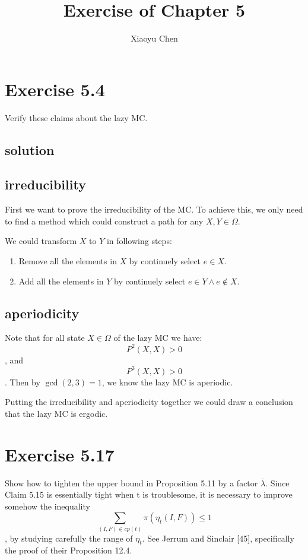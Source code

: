 \documentclass{article}
\title{Exercise of Chapter 5}
\author{Xiaoyu Chen}
\date{}
\begin{document}
\maketitle

\section{Exercise 5.4}
Verify these claims about the lazy MC.
\subsection{solution}
\subsection{irreducibility}
First we want to prove the irreducibility of the MC. To achieve this, we only need to find a method which could construct a path for any $X, Y\in\Omega$.
\begin{tcolorbox}[title = {Suppose we have $X, Y\in\Omega$}]
  We could transform $X$ to $Y$ in following steps:
  \begin{enumerate}[itemsep=0mm]
  \item Remove all the elements in $X$ by continuely select $e\in X$.
  \item Add all the elements in $Y$ by continuely select $e\in Y \land e\not\in X$.
  \end{enumerate}
\end{tcolorbox}
\subsection{aperiodicity}
Note that for all state $X\in\Omega$ of the lazy MC we have: \[P^2(X,X)>0\], and \[P^3(X,X) > 0\]. Then by $\gcd(2, 3) = 1$, we know the lazy MC is aperiodic.

Putting the irreducibility and aperiodicity together we could draw a conclusion that the lazy MC is ergodic.

\section{Exercise 5.17}
Show how to tighten the upper bound in Proposition 5.11 by a factor $\overline{\lambda}$. Since Claim 5.15 is essentially tight when t is troublesome, it is necessary to improve
somehow the inequality
\[
  \sum_{(I,F)\in cp(t)} \pi(\eta_t(I,F)) \leq 1
\], by studying carefully the range of $\eta_t$. See Jerrum and Sinclair [45], specifically the proof of their Proposition 12.4.
\end{document}
